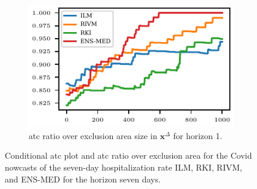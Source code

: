 \documentclass[pdflatex]{sn-jnl}
\theoremstyle{plain}%
\theoremstyle{definition}
\newcommand{\diffx}{\mathbf{x}^{\Delta}}
\begin{document}
\begin{figure}
\begin{subfigure}[t]{.48\textwidth}
    \end{subfigure}\hfill
    \begin{subfigure}[t]{.48\textwidth}
    \includegraphics{plots/covid_nowcast/40_acc_eps_lag_14}
    \caption{\ac{atc} ratio over exclusion area size in $\diffx$ for horizon 1.}\label{fig:app-covid-atc-ratio-14}
    \end{subfigure}
    \caption[Conditional ATC plot and ATC ratio over exclusion area in Covid nowcasting.]{Conditional \ac{atc} plot and \ac{atc} ratio over exclusion area for the Covid nowcasts of the seven-day hospitalization rate ILM, RKI, RIVM, and ENS-MED for the horizon seven days.}
    \label{fig:app-covid-cond-prob-atc-ratio-1-14}
\end{figure}
\end{document}
